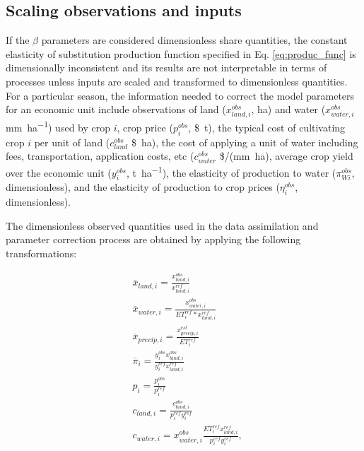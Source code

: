 \subsection{Scaling observations and inputs}\label{sec:scaling_obs}

If the $\beta$ parameters are considered dimensionless share quantities, the constant elasticity of substitution production function specified in Eq. \eqref{eq:produc_func} is dimensionally inconsistent and its results are not interpretable in terms of processes unless inputs are scaled and transformed to dimensionless quantities. For a particular season, the information needed to correct the model parameters for an economic unit include observations of land ($x^{obs}_{land,i}$, \si{\hectare}) and water ($x^{obs}_{water,i}$ \si{\milli\meter\per\hectare}) used by crop $i$, crop price ($p^{obs}_i$, \$\si{\per\tonne}), the typical cost of cultivating crop $i$ per unit of land ($c^{obs}_{land}$ \$\si{\per\hectare}), the cost of applying a unit of water including fees, transportation, application costs, etc ($c^{obs}_{water}$ \$/(\si{\milli\meter\hectare}), average crop yield over the economic unit ($y^{obs}_i$, \si{\tonne\per\hectare}), the elasticity of production to water ($\pi_{Wi}^{obs}$, dimensionless), and the elasticity of production to crop prices ($\eta^{obs}_i$, dimensionless). 

The dimensionless observed quantities used in the data assimilation and parameter correction process are obtained by applying the following transformations:

\begin{equation}
    \begin{split}
        &\overline{x}_{land,i} = \frac{x^{obs}_{land,i}}{x^{ref}_{land,i}}\\
        &\overline{x}_{water,i} = \frac{x^{obs}_{water,i}}{ET^{ref}_i * x^{ref}_{land,i}}\\
        &\overline{x}_{precip,i} = \frac{x^{est}_{precip,i}}{ET^{ref}_i}\\
        &\overline{\pi}_i = \frac{y^{obs}_i x^{obs}_{land,i}}{y^{ref}_ix^{ref}_{land,i}}\\
        &p_i = \frac{p^{obs}_i}{p^{ref}_i}\\
        &c_{land,i} = \frac{c^{obs}_{land,i}}{p^{ref}_i y^{ref}_i}\\
        &c_{water,i} = x^{obs}_{water,i}\frac{ET^{ref}_i x^{ref}_{land,i}}{p^{ref}_i y^{ref}_i},\\
    \end{split}
\end{equation}


